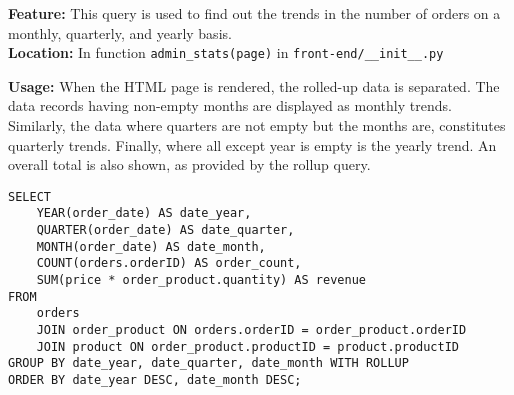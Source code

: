 \textbf{Feature:} This query is used to find out the trends in the number of orders on a monthly, quarterly, and yearly basis. \\
\textbf{Location:} In function \texttt{admin\_stats(page)} in \texttt{front-end/\_\_init\_\_.py}

\textbf{Usage:}
When the HTML page is rendered, the rolled-up data is separated.
The data records having non-empty months are displayed as monthly trends.
Similarly, the data where quarters are not empty but the months are, constitutes quarterly trends.
Finally, where all except year is empty is the yearly trend.
An overall total is also shown, as provided by the rollup query.

\vspace*{10pt}

\begin{lstlisting}
SELECT
    YEAR(order_date) AS date_year,
    QUARTER(order_date) AS date_quarter,
    MONTH(order_date) AS date_month,
    COUNT(orders.orderID) AS order_count,
    SUM(price * order_product.quantity) AS revenue
FROM
    orders
    JOIN order_product ON orders.orderID = order_product.orderID
    JOIN product ON order_product.productID = product.productID
GROUP BY date_year, date_quarter, date_month WITH ROLLUP
ORDER BY date_year DESC, date_month DESC;
\end{lstlisting}
